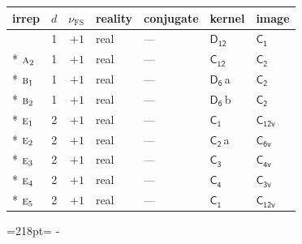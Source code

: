 \documentclass[10pt,a4paper]{article}
\newcommand{\needspace}[1]{\par\penalty-100\begingroup\dimen0=#1\relax\dimen2=\pagegoal
  \advance\dimen2-\pagetotal\ifdim\dimen0>\dimen2\relax\ifdim\dimen2>0pt\vfil\break\fi\fi
  \endgroup}
\numberwithin{equation}{section}
\newcommand{\grp}[1]{\mathsf{#1}}
\newcommand{\irr}[1]{\text{\normalfont\scshape #1}}
\newcommand{\detbox}[1]{{\setlength{\fboxsep}{1pt}\fbox{#1}}}
\newcommand{\clsletter}[1]{\,{\scriptsize\color{black!55}#1}}
\newcommand{\fsind}{\nu_{\mathrm{FS}}}
\begin{document}
{\small\renewcommand{\arraystretch}{1.25}\begin{longtable}{@{}lrrllll@{}}\toprule
irrep & $d$ & $\fsind$ & reality & conjugate & kernel & image\\\midrule\endhead
\bottomrule\endfoot\endlastfoot
\detbox{$\irr{a}_{1}$} & 1 & $+1$ & real & --- & \href{D12.pdf}{$\grp{D_{12}}$} & \href{C1.pdf}{$\grp{C_{1}}$}\\*
$\irr{a}_{2}$ & 1 & $+1$ & real & --- & \href{C12.pdf}{$\grp{C_{12}}$} & \href{C2.pdf}{$\grp{C_{2}}$}\\*
$\irr{b}_{1}$ & 1 & $+1$ & real & --- & \href{D6.pdf}{$\grp{D_{6}}$}\clsletter{a} & \href{C2.pdf}{$\grp{C_{2}}$}\\*
$\irr{b}_{2}$ & 1 & $+1$ & real & --- & \href{D6.pdf}{$\grp{D_{6}}$}\clsletter{b} & \href{C2.pdf}{$\grp{C_{2}}$}\\*
$\irr{e}_{1}$ & 2 & $+1$ & real & --- & \href{C1.pdf}{$\grp{C_{1}}$} & \href{C12v.pdf}{$\grp{C_{12v}}$}\\*
$\irr{e}_{2}$ & 2 & $+1$ & real & --- & \href{C2.pdf}{$\grp{C_{2}}$}\clsletter{a} & \href{C6v.pdf}{$\grp{C_{6v}}$}\\*
$\irr{e}_{3}$ & 2 & $+1$ & real & --- & \href{C3.pdf}{$\grp{C_{3}}$} & \href{C4v.pdf}{$\grp{C_{4v}}$}\\*
$\irr{e}_{4}$ & 2 & $+1$ & real & --- & \href{C4.pdf}{$\grp{C_{4}}$} & \href{C3v.pdf}{$\grp{C_{3v}}$}\\*
$\irr{e}_{5}$ & 2 & $+1$ & real & --- & \href{C1.pdf}{$\grp{C_{1}}$} & \href{C12v.pdf}{$\grp{C_{12v}}$}\\
\bottomrule\end{longtable}}
\needspace{218pt}
\end{document}
